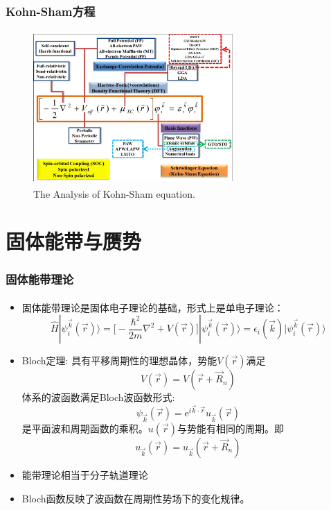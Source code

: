 \documentclass[cjk,slidestop,compress,mathserif,blue]{beamer}
\newcommand{\upcite}[1]{\hspace{0ex}\textsuperscript{\cite{#1}}} %
\begin{document}
\frame                               %
{
	\frametitle{\textrm{Kohn-Sham}方程}
\begin{figure}[h!]
\centering
\includegraphics[height=2.3in,width=3.0in,viewport=1 5 780 580,clip]{Figures/DFT.png}
\caption{\small \textrm{The Analysis of Kohn-Sham equation.}}%
\label{DFT}
\end{figure}
}

\section{固体能带与赝势}       %
\frame
{
\frametitle{固体能带理论}
\begin{itemize}%
   \setlength{\itemsep}{8pt}
   \item 固体能带理论\upcite{Huang_Han}是固体电子理论的基础，形式上是单电子理论：
    $$\hat H |\psi_i^{\vec k}(\vec r)\rangle=\bigg[-\dfrac{\hbar^2}{2m}\nabla^2+V(\vec r)\bigg]|\psi_i^{\vec k}(\vec r)\rangle=\epsilon_i(\vec k)|\psi_i^{\vec k}(\vec r)\rangle$$
  \item \textrm{Bloch}定理:
具有平移周期性的理想晶体，势能$V(\vec r)$满足$$V(\vec r)=V(\vec r+\vec R_n)$$
体系的波函数满足\textrm{Bloch}波函数形式:$$\psi_{\vec k}(\vec r)=\textrm{e}^{i\vec k\cdot\vec r}u_{\vec k}(\vec r)$$
是平面波和周期函数的乘积。$u(\vec r)$与势能有相同的周期。即$$u_{\vec k}(\vec r)=u_{\vec k}(\vec r+\vec R_n)$$
  \item 能带理论相当于分子轨道理论
\item \textrm{Bloch}函数反映了波函数在周期性势场下的变化规律。
\end{itemize}
}
\end{document}
